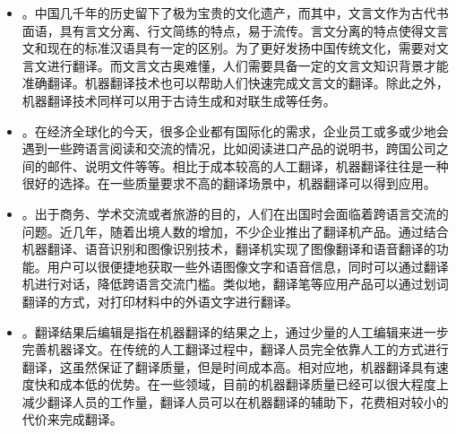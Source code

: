 \begin{itemize}
\item {\small{}}。中国几千年的历史留下了极为宝贵的文化遗产，而其中，文言文作为古代书面语，具有言文分离、行文简练的特点，易于流传。言文分离的特点使得文言文和现在的标准汉语具有一定的区别。为了更好发扬中国传统文化，需要对文言文进行翻译。而文言文古奥难懂，人们需要具备一定的文言文知识背景才能准确翻译。机器翻译技术也可以帮助人们快速完成文言文的翻译。除此之外，机器翻译技术同样可以用于古诗生成和对联生成等任务。

\item {\small{}}。在经济全球化的今天，很多企业都有国际化的需求，企业员工或多或少地会遇到一些跨语言阅读和交流的情况，比如阅读进口产品的说明书，跨国公司之间的邮件、说明文件等等。相比于成本较高的人工翻译，机器翻译往往是一种很好的选择。在一些质量要求不高的翻译场景中，机器翻译可以得到应用。

\item {\small{}}。出于商务、学术交流或者旅游的目的，人们在出国时会面临着跨语言交流的问题。近几年，随着出境人数的增加，不少企业推出了翻译机产品。通过结合机器翻译、语音识别和图像识别技术，翻译机实现了图像翻译和语音翻译的功能。用户可以很便捷地获取一些外语图像文字和语音信息，同时可以通过翻译机进行对话，降低跨语言交流门槛。类似地，翻译笔等应用产品可以通过划词翻译的方式，对打印材料中的外语文字进行翻译。

\item {\small{}}。翻译结果后编辑是指在机器翻译的结果之上，通过少量的人工编辑来进一步完善机器译文。在传统的人工翻译过程中，翻译人员完全依靠人工的方式进行翻译，这虽然保证了翻译质量，但是时间成本高。相对应地，机器翻译具有速度快和成本低的优势。在一些领域，目前的机器翻译质量已经可以很大程度上减少翻译人员的工作量，翻译人员可以在机器翻译的辅助下，花费相对较小的代价来完成翻译。

\end{itemize}


